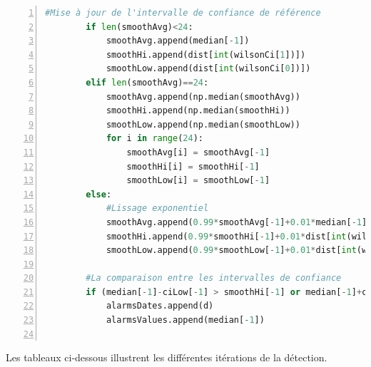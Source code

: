   \begin{lstlisting}[language=python,numbers=left,
  frame=single,
  showstringspaces=true,
  basicstyle=\footnotesize,
  keywordstyle=\color{blue}\ttfamily\textbf,
  identifierstyle=\color{magenta}\ttfamily,
  stringstyle=\color{red}\ttfamily,
  commentstyle=\color{cyan}\ttfamily\textit
  ]
		#Mise à jour de l'intervalle de confiance de référence
        if len(smoothAvg)<24:
	        smoothAvg.append(median[-1])
	        smoothHi.append(dist[int(wilsonCi[1])])
	        smoothLow.append(dist[int(wilsonCi[0])])
        elif len(smoothAvg)==24:
	        smoothAvg.append(np.median(smoothAvg))
	        smoothHi.append(np.median(smoothHi))
	        smoothLow.append(np.median(smoothLow))
	        for i in range(24):
		        smoothAvg[i] = smoothAvg[-1]
		        smoothHi[i] = smoothHi[-1]
		        smoothLow[i] = smoothLow[-1]
        else:
	        #Lissage exponentiel
	        smoothAvg.append(0.99*smoothAvg[-1]+0.01*median[-1])
	        smoothHi.append(0.99*smoothHi[-1]+0.01*dist[int(wilsonCi[1])])
	        smoothLow.append(0.99*smoothLow[-1]+0.01*dist[int(wilsonCi[0])])
        
        #La comparaison entre les intervalles de confiance 
        if (median[-1]-ciLow[-1] > smoothHi[-1] or median[-1]+ciHigh[-1] < smoothLow[-1]) and np.abs(median[-1]-smoothAvg[-1])>1:
	        alarmsDates.append(d)
	        alarmsValues.append(median[-1])
 
 \end{lstlisting}
 
 Les tableaux ci-dessous illustrent les différentes  itérations de la détection. 

